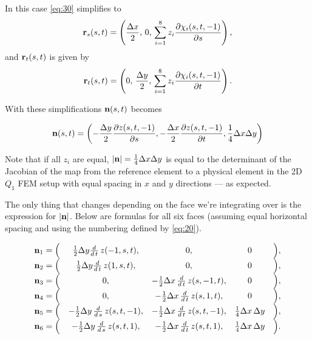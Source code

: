 \documentclass[11pt]{article}
\begin{document}
In this case \eqref{eq:30} simplifies to
\begin{equation}
  \label{eq:32}
  \mathbf{r}_{s}(s,t) = \left(
    \frac{\Delta x}{2},\,
    0,\,
    \sum_{i=1}^{8} z_{i} \frac{\partial \chi_{i}(s, t, -1)}{\partial s} \right),
\end{equation}
and $\mathbf{r}_{t}(s,t)$ is given by
\begin{equation}
  \label{eq:33}
  \mathbf{r}_{t}(s,t) = \left(
    0,\,
    \frac{\Delta y}{2},\,
    \sum_{i=1}^{8} z_{i} \frac{\partial \chi_{i}(s, t, -1)}{\partial t} \right).
\end{equation}

With these simplifications $\mathbf{n}(s,t)$ becomes

\begin{equation}
  \label{eq:34}
  \mathbf{n}(s,t) = \left(
    -\frac{\Delta y}{2}\frac{\partial z(s,t,-1)}{\partial s},
    -\frac{\Delta x}{2}\frac{\partial z(s,t,-1)}{\partial t},
    \frac{1}{4} \Delta x \Delta y
  \right)
\end{equation}

Note that if all $z_{i}$ are equal, $|\mathbf{n}| = \frac{1}{4} \Delta x \Delta y$ is
equal to the determinant of the Jacobian of the map from the reference
element to a physical element in the 2D $Q_{1}$ FEM setup with equal
spacing in $x$ and $y$ directions --- as expected.

The only thing that changes depending on the face we're integrating
over is the expression for $|\mathbf{n}|$. Below are formulas for all six
faces (assuming equal horizontal spacing and using the numbering
defined by \eqref{eq:20}).

\newcommand{\ddt}{\frac{d}{d\,t}}
\newcommand{\dds}{\frac{d}{d\,s}}
\begin{align*}
  \begin{array}{rcccl}
    \N_{1} = \Big( & \frac{1}{2}\dy\ddt\,z(-1 , s , t),& 0 ,& 0 & \Big) , \\
    \N_{2} = \Big( & \frac{1}{2}\dy\ddt\,z(1 , s , t),& 0 ,& 0 & \Big) , \\
    \N_{3} = \Big( & 0 ,& -\frac{1}{2}\dx\,\ddt\,z(s , -1 , t),& 0 & \Big) , \\
    \N_{4} = \Big( & 0 ,& -\frac{1}{2}\dx\,\ddt\,z(s , 1 , t),& 0 & \Big) , \\
    \N_{5} = \Big( & -\frac{1}{2}\dy\,\dds\,z(s , t , -1) ,& -\frac{1}{2}\dx\,\ddt\,z(s , t , -1) ,& \frac{1}{4}\dx\,\dy & \Big) , \\
    \N_{6} = \Big( & -\frac{1}{2}\dy\,\dds\,z(s , t , 1) ,& -\frac{1}{2}\dx\,\ddt\,z(s , t , 1) ,& \frac{1}{4}\dx\,\dy & \Big) . \\
  \end{array}
\end{align*}
\end{document}
